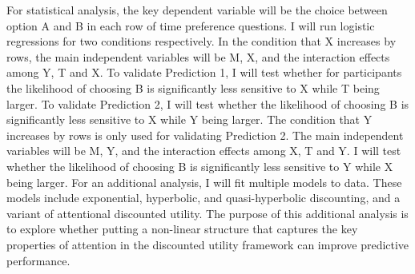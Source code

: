 \documentclass[
  12pt,
]{article}
\begin{document}
For statistical analysis, the key dependent variable will be the choice
between option A and B in each row of time preference questions. I will
run logistic regressions for two conditions respectively. In the
condition that X increases by rows, the main independent variables will
be M, X, and the interaction effects among Y, T and X. To validate
Prediction 1, I will test whether for participants the likelihood of
choosing B is significantly less sensitive to X while T being larger. To
validate Prediction 2, I will test whether the likelihood of choosing B
is significantly less sensitive to X while Y being larger. The condition
that Y increases by rows is only used for validating Prediction 2. The
main independent variables will be M, Y, and the interaction effects
among X, T and Y. I will test whether the likelihood of choosing B is
significantly less sensitive to Y while X being larger. For an
additional analysis, I will fit multiple models to data. These models
include exponential, hyperbolic, and quasi-hyperbolic discounting, and a
variant of attentional discounted utility. The purpose of this
additional analysis is to explore whether putting a non-linear structure
that captures the key properties of attention in the discounted utility
framework can improve predictive performance.
\end{document}
